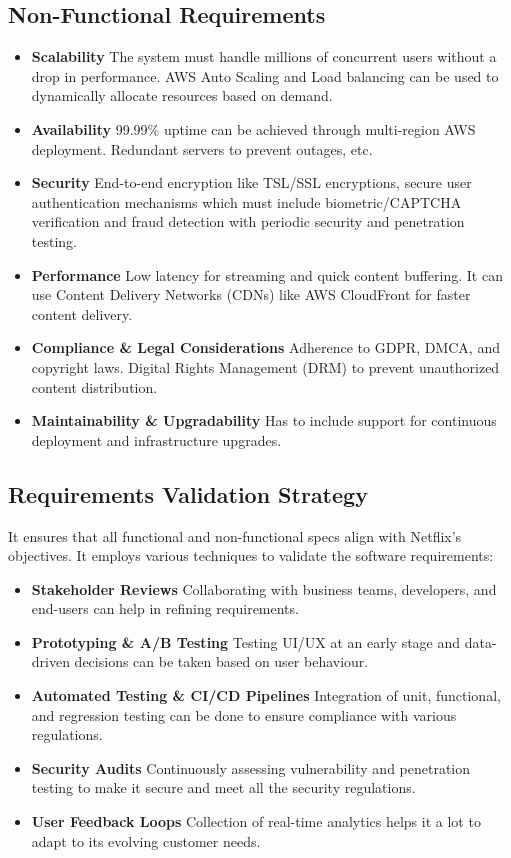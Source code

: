 \documentclass[a4paper,10pt,twoside]{article}
\begin{document}
\subsection{Non-Functional Requirements}
\begin{itemize}
    \item \textbf{Scalability} The system must handle millions of concurrent users without a drop in performance. AWS Auto Scaling and Load balancing can be used to dynamically allocate resources based on demand.
    \item \textbf{Availability} 99.99\% uptime can be achieved through multi-region AWS deployment. Redundant servers to prevent outages, etc.
    \item \textbf{Security} End-to-end encryption like TSL/SSL encryptions, secure user authentication mechanisms which must include biometric/CAPTCHA verification and fraud detection with periodic security and penetration testing.
    \item \textbf{Performance} Low latency for streaming and quick content buffering. It can use Content Delivery Networks (CDNs) like AWS CloudFront for faster content delivery.
    \item \textbf{Compliance \& Legal Considerations} Adherence to GDPR, DMCA, and copyright laws. Digital Rights Management (DRM) to prevent unauthorized content distribution.
    \item \textbf{Maintainability \& Upgradability} Has to include support for continuous deployment and infrastructure upgrades.
\end{itemize}

\subsection{Requirements Validation Strategy}
It ensures that all functional and non-functional specs align with Netflix’s objectives. It employs various techniques to validate the software requirements:
\begin{itemize}
    \item \textbf{Stakeholder Reviews} Collaborating with business teams, developers, and end-users can help in refining requirements.
    \item \textbf{Prototyping \& A/B Testing} Testing UI/UX at an early stage and data-driven decisions can be taken based on user behaviour.
    \item \textbf{Automated Testing \& CI/CD Pipelines} Integration of unit, functional, and regression testing can be done to ensure compliance with various regulations.
    \item \textbf{Security Audits} Continuously assessing vulnerability and penetration testing to make it secure and meet all the security regulations.
    \item \textbf{User Feedback Loops} Collection of real-time analytics helps it a lot to adapt to its evolving customer needs.
\end{itemize}
\end{document}
